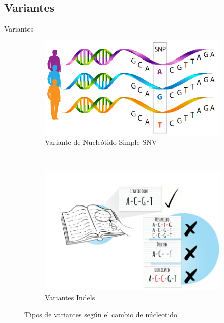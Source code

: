 \documentclass[xcolor=dvipsnames]{beamer}
\begin{document}
\subsection{Variantes}
\begin{frame}{Variantes}
	\begin{figure}
		\centering
		\begin{subfigure}[b]{0.47\textwidth}
			\includegraphics[width=\textwidth]{snp.png}
			\caption{Variante de Nucleótido Simple SNV}
		\end{subfigure}
		~ %
		\begin{subfigure}[b]{0.47\textwidth}
			\includegraphics[width=\textwidth]{variante.png}
			\caption{ Variantes Indels}
		\end{subfigure}
		\caption{Tipos de variantes según el cambio de núcleotido}
	\end{figure}
	
\end{frame}
\end{document}
